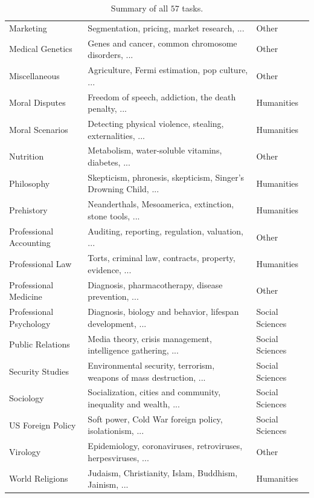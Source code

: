 \begin{table}[h]
{\begin{tabular}{lll}
Marketing & Segmentation, pricing, market research, ... & Other \\
Medical Genetics & Genes and cancer, common chromosome disorders, ... & Other \\
Miscellaneous & Agriculture, Fermi estimation, pop culture, ... & Other \\
Moral Disputes & Freedom of speech, addiction, the death penalty, ... & Humanities \\
Moral Scenarios & Detecting physical violence, stealing, externalities, ... & Humanities \\
Nutrition & Metabolism, water-soluble vitamins, diabetes, ... & Other \\
Philosophy & Skepticism, phronesis, skepticism, Singer's Drowning Child, ... & Humanities \\
Prehistory & Neanderthals, Mesoamerica, extinction, stone tools, ... & Humanities \\
Professional Accounting & Auditing, reporting, regulation, valuation, ... & Other \\
Professional Law &  Torts, criminal law, contracts, property, evidence, ... & Humanities \\
Professional Medicine & Diagnosis, pharmacotherapy, disease prevention, ... & Other \\
Professional Psychology & Diagnosis, biology and behavior, lifespan development, ... & Social Sciences \\
Public Relations & Media theory, crisis management, intelligence gathering, ... & Social Sciences \\
Security Studies & Environmental security, terrorism, weapons of mass destruction, ... & Social Sciences \\
Sociology & Socialization, cities and community, inequality and wealth, ... & Social Sciences \\
US Foreign Policy & Soft power, Cold War foreign policy, isolationism, ... & Social Sciences \\
Virology & Epidemiology, coronaviruses, retroviruses, herpesviruses, ... & Other \\
World Religions & Judaism, Christianity, Islam, Buddhism, Jainism, ... & Humanities\\
\hline
\end{tabular}}
\caption{Summary of all $57$ tasks.}
\label{tab:datasetdescriptions}
\end{table}



